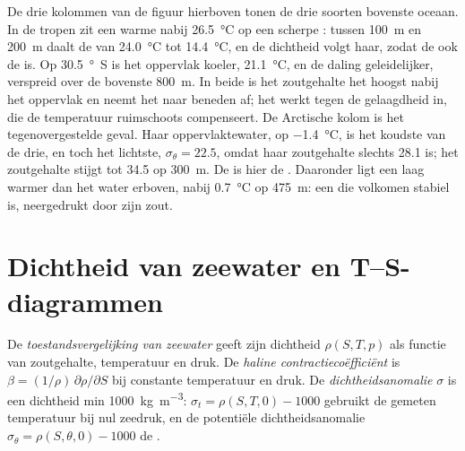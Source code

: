 De drie kolommen van de figuur hierboven tonen de drie soorten bovenste oceaan. In de tropen zit een warme  nabij \qty{26.5}{\celsius} op een scherpe : tussen \qty{100}{m} en \qty{200}{m} daalt de  van \qty{24.0}{\celsius} tot \qty{14.4}{\celsius}, en de dichtheid volgt haar, zodat de  ook de  is. Op \qty{30.5}{\degree S} is het oppervlak koeler, \qty{21.1}{\celsius}, en de daling geleidelijker, verspreid over de bovenste \qty{800}{m}. In beide is het zoutgehalte het hoogst nabij het oppervlak en neemt het naar beneden af; het werkt tegen de gelaagdheid in, die de temperatuur ruimschoots compenseert. De Arctische kolom is het tegenovergestelde geval. Haar oppervlaktewater, op \qty{-1.4}{\celsius}, is het koudste van de drie, en toch het lichtste, $\sigma_\theta = 22.5$, omdat haar zoutgehalte slechts \num{28.1} is; het zoutgehalte stijgt tot \num{34.5} op \qty{300}{m}. De  is hier de . Daaronder ligt een laag warmer dan het water erboven, nabij \qty{0.7}{\celsius} op \qty{475}{m}: een  die volkomen stabiel is, neergedrukt door zijn zout.

\section{Dichtheid van zeewater en T--S-diagrammen}\label{sec:b1:fluid-envelopes-structure:ts}

\begin{definition}\label{def:b1:fluid-envelopes-structure:eos}
De \emph{toestandsvergelijking van zeewater}
geeft zijn dichtheid $\rho(S, T, p)$ als functie van zoutgehalte, temperatuur en
druk. De \emph{haline contractiecoëfficiënt}
is $\beta = (1/\rho)\,\partial\rho/\partial S$ bij constante temperatuur en druk. De \emph{dichtheidsanomalie}
$\sigma$ is een dichtheid min \qty{1000}{kg.m^{-3}}: $\sigma_t = \rho(S, T, 0) -
1000$ gebruikt de gemeten temperatuur bij nul zeedruk, en de potentiële dichtheidsanomalie $\sigma_\theta = \rho(S, \theta, 0) - 1000$ de
.
\end{definition}

